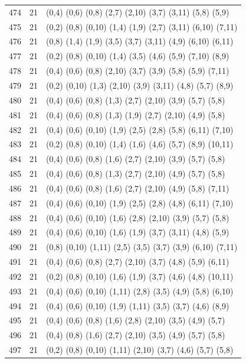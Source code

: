 {\begin{longtable}{lll}
474 & 21 & (0,4) (0,6) (0,8) (2,7) (2,10) (3,7) (3,11) (5,8) (5,9) \\
475 & 21 & (0,2) (0,8) (0,10) (1,4) (1,9) (2,7) (3,11) (6,10) (7,11) \\
476 & 21 & (0,8) (1,4) (1,9) (3,5) (3,7) (3,11) (4,9) (6,10) (6,11) \\
477 & 21 & (0,2) (0,8) (0,10) (1,4) (3,5) (4,6) (5,9) (7,10) (8,9) \\
478 & 21 & (0,4) (0,6) (0,8) (2,10) (3,7) (3,9) (5,8) (5,9) (7,11) \\
479 & 21 & (0,2) (0,10) (1,3) (2,10) (3,9) (3,11) (4,8) (5,7) (8,9) \\
480 & 21 & (0,4) (0,6) (0,8) (1,3) (2,7) (2,10) (3,9) (5,7) (5,8) \\
481 & 21 & (0,4) (0,6) (0,8) (1,3) (1,9) (2,7) (2,10) (4,9) (5,8) \\
482 & 21 & (0,4) (0,6) (0,10) (1,9) (2,5) (2,8) (5,8) (6,11) (7,10) \\
483 & 21 & (0,2) (0,8) (0,10) (1,4) (1,6) (4,6) (5,7) (8,9) (10,11) \\
484 & 21 & (0,4) (0,6) (0,8) (1,6) (2,7) (2,10) (3,9) (5,7) (5,8) \\
485 & 21 & (0,4) (0,6) (0,8) (1,3) (2,7) (2,10) (4,9) (5,7) (5,8) \\
486 & 21 & (0,4) (0,6) (0,8) (1,6) (2,7) (2,10) (4,9) (5,8) (7,11) \\
487 & 21 & (0,4) (0,6) (0,10) (1,9) (2,5) (2,8) (4,8) (6,11) (7,10) \\
488 & 21 & (0,4) (0,6) (0,10) (1,6) (2,8) (2,10) (3,9) (5,7) (5,8) \\
489 & 21 & (0,4) (0,6) (0,10) (1,6) (1,9) (3,7) (3,11) (4,8) (5,9) \\
490 & 21 & (0,8) (0,10) (1,11) (2,5) (3,5) (3,7) (3,9) (6,10) (7,11) \\
491 & 21 & (0,4) (0,6) (0,8) (2,7) (2,10) (3,7) (4,8) (5,9) (6,11) \\
492 & 21 & (0,2) (0,8) (0,10) (1,6) (1,9) (3,7) (4,6) (4,8) (10,11) \\
493 & 21 & (0,4) (0,6) (0,10) (1,11) (2,8) (3,5) (4,9) (5,8) (6,10) \\
494 & 21 & (0,4) (0,6) (0,10) (1,9) (1,11) (3,5) (3,7) (4,6) (8,9) \\
495 & 21 & (0,4) (0,6) (0,8) (1,6) (2,8) (2,10) (3,5) (4,9) (5,7) \\
496 & 21 & (0,4) (0,8) (1,6) (2,7) (2,10) (3,5) (4,9) (5,7) (5,8) \\
497 & 21 & (0,2) (0,8) (0,10) (1,11) (2,10) (3,7) (4,6) (5,7) (5,8) \\

\end{longtable}}

